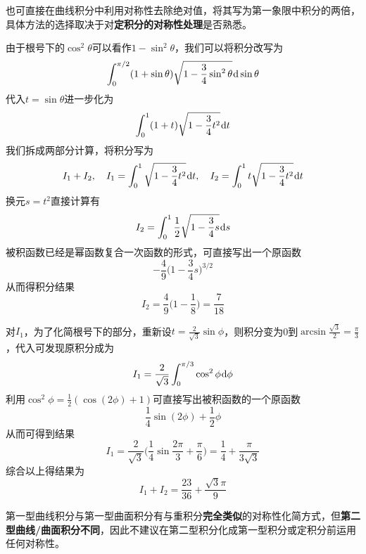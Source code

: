 \documentclass[a4paper,UTF8,fontset=windows,AutoFakeBold]{ctexart}
\newcommand*{\dr}{\hspace{0.07em}\mathrm{d}}
\newcommand*{\note}{\noindent *}
\theoremstyle{ex}
\begin{document}
\begin{framed}
{    \note 也可直接在曲线积分中利用对称性去除绝对值，将其写为第一象限中积分的两倍，具体方法的选择取决于对\textbf{定积分的对称性处理}是否熟悉。

    由于根号下的$\cos^2\theta$可以看作$1-\sin^2\theta$，我们可以将积分改写为
    $$\int_0^{\pi/2}(1+\sin\theta)\sqrt{1-\frac{3}{4}\sin^2\theta}\dr\sin\theta$$
    代入$t=\sin\theta$进一步化为
    $$\int_0^1(1+t)\sqrt{1-\frac{3}{4}t^2}\dr t$$
    我们拆成两部分计算，将积分写为
    $$I_1+I_2,\quad I_1=\int_0^1\sqrt{1-\frac{3}{4}t^2}\dr t,\quad I_2=\int_0^1t\sqrt{1-\frac{3}{4}t^2}\dr t$$
    换元$s=t^2$直接计算有
    $$I_2=\int_0^1\frac{1}{2}\sqrt{1-\frac{3}{4}s}\dr s$$
    被积函数已经是幂函数复合一次函数的形式，可直接写出一个原函数
    $$-\frac{4}{9}\bigg(1-\frac{3}{4}s\bigg)^{3/2}$$
    从而得积分结果
    $$I_2=\frac{4}{9}\bigg(1-\frac{1}{8}\bigg)=\frac{7}{18}$$

    对$I_1$，为了化简根号下的部分，重新设$t=\frac{2}{\sqrt3}\sin\phi$，则积分变为0到$\arcsin\frac{\sqrt3}{2}=\frac{\pi}{3}$，代入可发现原积分成为
    $$I_1=\frac{2}{\sqrt3}\int_0^{\pi/3}\cos^2\phi\dr\phi$$
    利用$\cos^2\phi=\frac{1}{2}(\cos(2\phi)+1)$可直接写出被积函数的一个原函数
    $$\frac{1}{4}\sin(2\phi)+\frac{1}{2}\phi$$
    从而可得到结果
    $$I_1=\frac{2}{\sqrt3}\bigg(\frac{1}{4}\sin\frac{2\pi}{3}+\frac{\pi}{6}\bigg)=\frac{1}{4}+\frac{\pi}{3\sqrt3}$$
    综合以上得结果为
    $$I_1+I_2=\frac{23}{36}+\frac{\sqrt3\pi}{9}$$
}
\end{framed}

\note 第一型曲线积分与第一型曲面积分有与重积分\textbf{完全类似}的对称性化简方式，但\textbf{第二型曲线/曲面积分不同}，因此不建议在第二型积分化成第一型积分或定积分前运用任何对称性。
\end{document}
